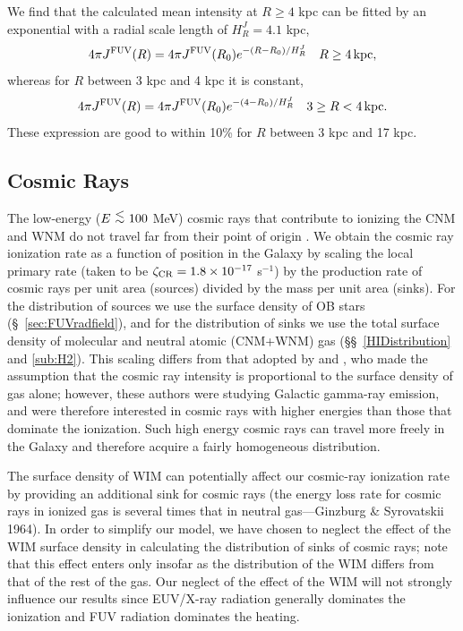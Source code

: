 \documentclass[12pt,preprint,flushrt]{aastex}
\newcommand{\al}{\mbox{ \raisebox{-.4ex}{$\stackrel{\textstyle <}{\sim}$} }}
\begin{document}
We find that the calculated mean intensity
at $R\ge 4$ kpc can be fitted by  an exponential
with a radial scale length of $H_R^J = 4.1$ kpc,
\begin{equation}
    4\pi J^{\rm FUV}(R) = 4\pi J^{\rm FUV}(R_0){ e}^{-(R-R_0)/H_R^J}  
         \, \, \,\,\,\,R\ge 4\,{\rm kpc},
\end{equation}
whereas for $R$ between 3 kpc and 4 kpc it is constant,
\begin{equation}
  4\pi J^{\rm FUV}(R) = 4\pi J^{\rm FUV}(R_0){e}^{-(4-R_0)/H_R^J}  
         \, \, \,\,\,\,3 \ge R < 4\,{\rm kpc}.
\end{equation}
These expression are good  to within 10\% for $R$ between 3 kpc and 17 kpc.

\subsection{Cosmic Rays}

The low-energy ($E\al 100$ MeV)
cosmic rays that contribute to ionizing the
CNM and WNM do not travel far from their point of origin \citep{kul71,spi75}.
We obtain the cosmic ray ionization
rate as a function of position in the Galaxy by scaling the local
primary rate
(taken to be $\zeta_{\rm CR} = 1.8\times 10^{-17}$ s$^{-1}$)
by the production rate of cosmic rays per unit area (sources) divided by
the mass per unit area (sinks). For the distribution of sources
we use the surface density of OB stars (\S~\ref{sec:FUVradfield}),
and for the distribution of sinks we use the total surface density of molecular
and neutral atomic (CNM+WNM) gas (\S\S~\ref{HIDistribution} and
\ref{sub:H2}). This scaling differs from that
adopted by \cite{hun97} and \cite{bert93},
who made the assumption that the cosmic ray intensity is
proportional to the  surface density of gas alone;
however, these authors
were studying Galactic gamma-ray emission, and
were therefore interested in cosmic rays with higher energies
than those that dominate the ionization. Such high energy cosmic
rays can travel more freely in the Galaxy and therefore acquire
a fairly homogeneous distribution.

The surface
density of WIM can potentially affect our cosmic-ray ionization rate
by providing an additional sink for cosmic rays
(the energy loss
rate for cosmic rays in ionized gas is several times that
in neutral gas---Ginzburg \& Syrovatskii 1964).
In order to
simplify our model, we have chosen to neglect the effect of the
WIM surface density in calculating the distribution of sinks of cosmic
rays;
note that this effect enters only insofar as the distribution of
the WIM differs from that of the rest of the gas.
Our neglect of the effect of the WIM
will not strongly influence our results since EUV/X-ray  radiation 
generally dominates the ionization and FUV radiation dominates the
heating.
\end{document}
